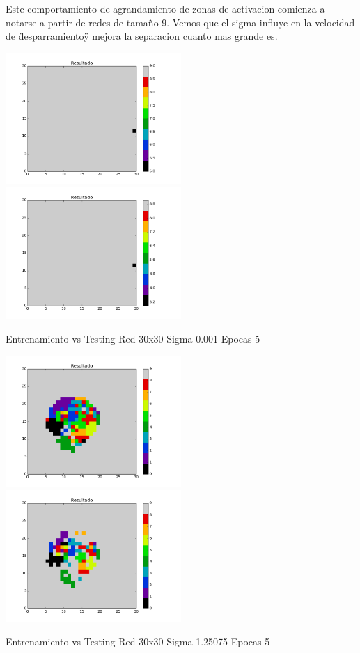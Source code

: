 Este comportamiento de agrandamiento de zonas de activacion comienza a notarse a partir de redes de tamaño 9. Vemos que el sigma influye en la velocidad de \"desparramiento\" y mejora la separacion cuanto mas grande es.

\includegraphics[width=0.5\textwidth]{img/EJ2_Sigma/train_M_30_sigma_0_001_epocas_5}
\includegraphics[width=0.5\textwidth]{img/EJ2_Sigma/test_M_30_sigma_0_001_epocas_5}
{\center \footnotesize Entrenamiento vs Testing Red 30x30 Sigma 0.001 Epocas 5\par}

\includegraphics[width=0.5\textwidth]{img/EJ2_Sigma/train_M_30_sigma_1_25075_epocas_5}
\includegraphics[width=0.5\textwidth]{img/EJ2_Sigma/test_M_30_sigma_1_25075_epocas_5}
{\center \footnotesize Entrenamiento vs Testing Red 30x30 Sigma 1.25075 Epocas 5\par}

